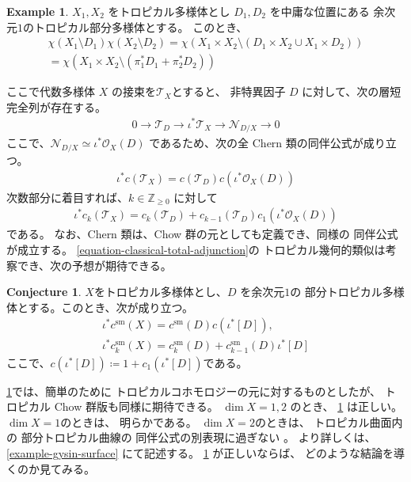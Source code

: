 \documentclass[a4paper,dvipdfmx,reqno,12pt]{amsart}
\theoremstyle{definition}
\newtheorem{example}[theorem]{Example}
\newtheorem{conjecture}[theorem]{Conjecture}
\newcommand{\deq}{\coloneqq}
\numberwithin{equation}{section}
\begin{document}
\begin{example}
$X_1,X_2$ をトロピカル多様体とし 
$D_1,D_2$ を中庸な位置にある
余次元$1$のトロピカル部分多様体とする。
このとき、
\begin{align}
\chi(X_1\setminus D_1)\chi(X_2\setminus D_2)
=\chi(X_1\times X_2 \setminus (D_1\times X_2\cup X_1\times D_2)) \\
=\chi(X_1\times X_2 \setminus (\pi_1^{*}D_1+\pi_2^{*}D_2))
\end{align}

\end{example}

ここで代数多様体 $X$ の接束を$\mathcal{T}_X$とすると、
非特異因子 $D$ に対して、次の層短完全列が存在する。
\begin{align}
0 \to \mathcal{T}_{D}\to \iota^{*}\mathcal{T}_X
\to \mathcal{N}_{D/X}\to 0
\end{align}
ここで、$\mathcal{N}_{D/X}\simeq \iota^{*}\mathcal{O}_X(D)$
であるため、次の全 Chern 類の同伴公式が成り立つ。
\begin{align}
\label{equation-classical-total-adjunction}
\iota^{*}c(\mathcal{T}_X)
=c(\mathcal{T}_{D})c(\iota^{*}\mathcal{O}_X(D))
\end{align}
次数部分に着目すれば、$k\in \mathbb{Z}_{\geq 0}$
に対して
\begin{align}
\label{equation-classical-total-adjunction}
\iota^{*}c_k(\mathcal{T}_X)
=c_{k}(\mathcal{T}_{D})+
c_{k-1}(\mathcal{T}_{D})c_1(\iota^{*}\mathcal{O}_X(D))
\end{align}
である。
なお、Chern 類は、Chow 群の元としても定義でき、同様の
同伴公式が成立する。
\eqref{equation-classical-total-adjunction}の
トロピカル幾何的類似は考察でき、次の予想が期待できる。
\begin{conjecture}
\label{conjecture-grr-divisor}
$X$をトロピカル多様体とし、$D$ を余次元$1$の
部分トロピカル多様体とする。このとき、次が成り立つ。
\begin{align}
\label{equation-total-adjunction}
\iota^{*}c^{\mathrm{sm}}(X)=c^{\mathrm{sm}}(D)c(\iota^{*}[D]), \\ 
\iota^{*}c^{\mathrm{sm}}_k(X)=c^{\mathrm{sm}}_k(D)+c^{\mathrm{sm}}_{k-1}(D)\iota^{*}[D]
\end{align}
ここで、$c(\iota^{*}[D])\deq 1+c_1(\iota^{*}[D])$である。 
\end{conjecture}
\cref{conjecture-grr-divisor}では、簡単のために
トロピカルコホモロジーの元に対するものとしたが、
トロピカル Chow 群版も同様に期待できる。
$\dim X=1,2$ のとき、
\cref{conjecture-grr-divisor}
は正しい。$\dim X=1$のときは、
明らかである。
$\dim X=2$のときは、
トロピカル曲面内の
部分トロピカル曲線の
同伴公式の別表現に過ぎない
\cite[Theorem 6]{shaw2015tropical}。
より詳しくは、\cref{example-gysin-surface}
にて記述する。
\cref{conjecture-grr-divisor} 
が正しいならば、
どのような結論を導くのか見てみる。
\end{document}

